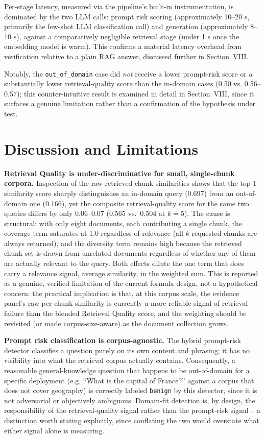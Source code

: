 \documentclass[conference]{IEEEtran}
\begin{document}
Per-stage latency, measured via the pipeline's built-in instrumentation, is dominated by
the two LLM calls: prompt risk scoring (approximately 10--20 s, primarily the few-shot
LLM classification call) and generation (approximately 8--10 s), against a comparatively
negligible retrieval stage (under 1 s once the embedding model is warm). This confirms a
material latency overhead from verification relative to a plain RAG answer, discussed
further in Section~VIII.

Notably, the \texttt{out\_of\_domain} case did \emph{not} receive a lower prompt-risk
score or a substantially lower retrieval-quality score than the in-domain cases (0.50 vs.
0.56--0.57); this counter-intuitive result is examined in detail in Section~VIII, since
it surfaces a genuine limitation rather than a confirmation of the hypothesis under test.

\section{Discussion and Limitations}

\textbf{Retrieval Quality is under-discriminative for small, single-chunk corpora.}
Inspection of the raw retrieved-chunk similarities shows that the top-1 similarity score
sharply distinguishes an in-domain query (0.697) from an out-of-domain one (0.166), yet
the composite retrieval-quality score for the same two queries differs by only 0.06--0.07
(0.565 vs.\ 0.504 at $k{=}5$). The cause is structural: with only eight documents, each
contributing a single chunk, the coverage term saturates at 1.0 regardless of relevance
(all $k$ requested chunks are always returned), and the diversity term remains high
because the retrieved chunk set is drawn from unrelated documents regardless of whether
any of them are actually relevant to the query. Both effects dilute the one term that
does carry a relevance signal, average similarity, in the weighted sum. This is reported
as a genuine, verified limitation of the current formula design, not a hypothetical
concern: the practical implication is that, at this corpus scale, the evidence panel's
raw per-chunk similarity is currently a more reliable signal of retrieval failure than
the blended Retrieval Quality score, and the weighting should be revisited (or made
corpus-size-aware) as the document collection grows.

\textbf{Prompt risk classification is corpus-agnostic.} The hybrid prompt-risk detector
classifies a question purely on its own content and phrasing; it has no visibility into
what the retrieval corpus actually contains. Consequently, a reasonable general-knowledge
question that happens to be out-of-domain for a specific deployment (e.g. ``What is the
capital of France?'' against a corpus that does not cover geography) is correctly
labeled \texttt{benign} by this detector, since it is not adversarial or objectively
ambiguous. Domain-fit detection is, by design, the responsibility of the retrieval-quality
signal rather than the prompt-risk signal -- a distinction worth stating explicitly,
since conflating the two would overstate what either signal alone is measuring.
\end{document}
